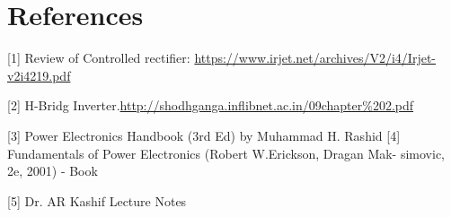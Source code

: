 \chapter{References} %
\label{Chapter5}
[1] Review of Controlled rectifier: \url{https://www.irjet.net/archives/V2/i4/Irjet-v2i4219.pdf} 

[2] H-Bridg Inverter.\url{http://shodhganga.inflibnet.ac.in/09chapter%202.pdf} 

[3] Power Electronics Handbook (3rd Ed) by Muhammad H. Rashid
[4] Fundamentals of Power Electronics (Robert W.Erickson, Dragan Mak-
simovic, 2e, 2001) - Book

[5] Dr. AR Kashif Lecture Notes